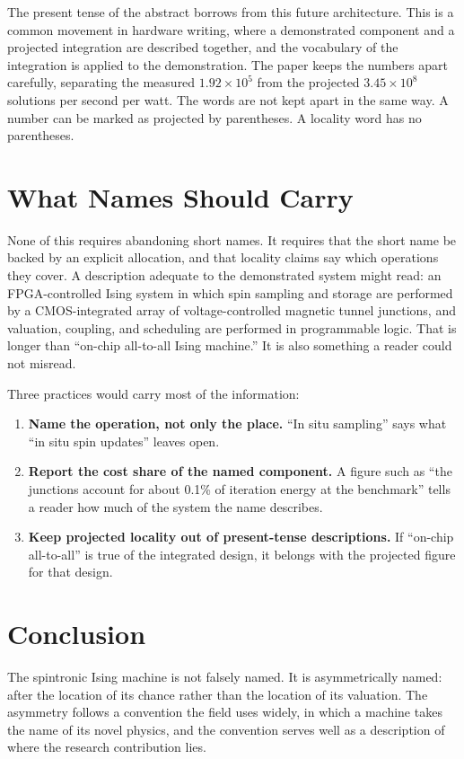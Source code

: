 \documentclass[11pt]{article}
\theoremstyle{definition}
\theoremstyle{remark}
\begin{document}
The present tense of the abstract borrows from this future architecture. This is a common movement in hardware writing, where a demonstrated component and a projected integration are described together, and the vocabulary of the integration is applied to the demonstration. The paper keeps the numbers apart carefully, separating the measured $1.92 \times 10^5$ from the projected $3.45 \times 10^8$ solutions per second per watt. The words are not kept apart in the same way. A number can be marked as projected by parentheses. A locality word has no parentheses.

\section{What Names Should Carry}

None of this requires abandoning short names. It requires that the short name be backed by an explicit allocation, and that locality claims say which operations they cover. A description adequate to the demonstrated system might read: an FPGA-controlled Ising system in which spin sampling and storage are performed by a CMOS-integrated array of voltage-controlled magnetic tunnel junctions, and valuation, coupling, and scheduling are performed in programmable logic. That is longer than ``on-chip all-to-all Ising machine.'' It is also something a reader could not misread.

Three practices would carry most of the information:
\begin{enumerate}
\item \textbf{Name the operation, not only the place.} ``In situ sampling'' says what ``in situ spin updates'' leaves open.
\item \textbf{Report the cost share of the named component.} A figure such as ``the junctions account for about 0.1\% of iteration energy at the benchmark'' tells a reader how much of the system the name describes.
\item \textbf{Keep projected locality out of present-tense descriptions.} If ``on-chip all-to-all'' is true of the integrated design, it belongs with the projected figure for that design.
\end{enumerate}

\section{Conclusion}

The spintronic Ising machine is not falsely named. It is asymmetrically named: after the location of its chance rather than the location of its valuation. The asymmetry follows a convention the field uses widely, in which a machine takes the name of its novel physics, and the convention serves well as a description of where the research contribution lies.
\end{document}

